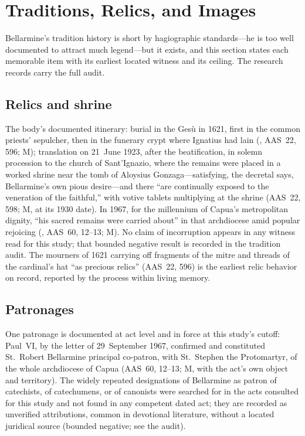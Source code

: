 \section{Traditions, Relics, and Images}
\label{sec:traditions}

Bellarmine's tradition history is short by hagiographic
standards---he is too well documented to attract much legend---but
it exists, and this section states each memorable item with its
earliest located witness and its ceiling. The research records
carry the full audit.

\subsection{Relics and shrine}

The body's documented itinerary: burial in the Ges\`u in 1621,
first in the common priests' sepulcher, then in the funerary crypt
where Ignatius had lain (, AAS~22, 596; M);
translation on 21~June 1923, after the beatification, in solemn
procession to the church of Sant'Ignazio, where the remains were
placed in a worked shrine near the tomb of Aloysius
Gonzaga---satisfying, the decretal says, Bellarmine's own pious
desire---and there ``are continually exposed to the veneration of
the faithful,'' with votive tablets multiplying at the shrine
(AAS~22, 598; M, at its 1930 date). In 1967, for the millennium of
Capua's metropolitan dignity, ``his sacred remains were carried
about'' in that archdiocese amid popular rejoicing (, AAS~60, 12--13; M). No claim of incorruption appears in
any witness read for this study; that bounded negative result is
recorded in the tradition audit. The mourners of 1621 carrying
off fragments of the mitre and threads of the cardinal's hat
``as precious relics'' (AAS~22, 596) is the earliest relic
behavior on record, reported by the process within living memory.

\subsection{Patronages}

One patronage is documented at act level and in force at this
study's cutoff: Paul~VI, by the letter  of
29~September 1967, confirmed and constituted St.~Robert
Bellarmine principal co-patron, with St.~Stephen the Protomartyr,
of the whole archdiocese of Capua (AAS~60, 12--13; M, with the
act's own object and territory). The widely repeated designations
of Bellarmine as patron of catechists, of catechumens, or of
canonists were searched for in the acts consulted for this study
and not found in any competent dated act; they are recorded as
unverified attributions, common in devotional literature, without
a located juridical source (bounded negative; see the audit).

